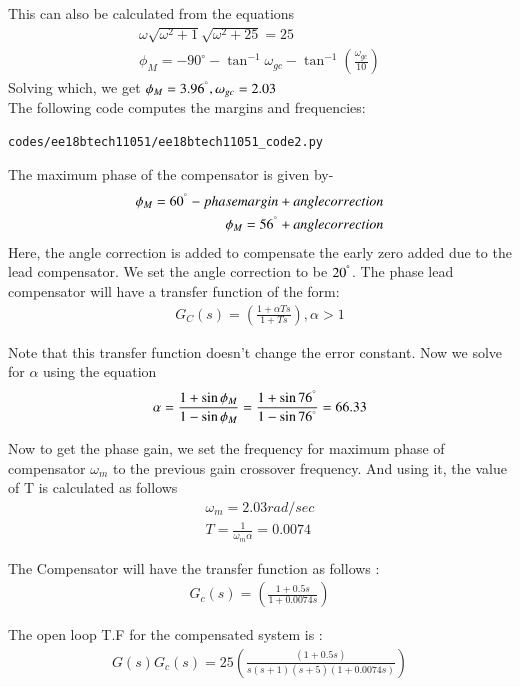 \begin{enumerate}[label=\thesection.\arabic*.,ref=\thesection.\theenumi]
This can also be calculated from the equations
\begin{align}
    \omega \sqrt{\omega^2 + 1} \sqrt{\omega^2 + 25} = 25\\
    \phi_{M} = -90^{\circ} - \tan^{-1}{\omega_{gc}} - \tan^{-1}({\frac{\omega_{gc}}{10}})
\end{align}
Solving which, we get $\phi_{M} =  3.96^{\degree} , \omega_{gc} =  2.03$\\

The following code computes the margins and frequencies:
\begin{lstlisting}
codes/ee18btech11051/ee18btech11051_code2.py
\end{lstlisting}

The maximum phase of the compensator is given by-
\begin{align}
    \phi_{M} = 60^{\degree} - phase margin + angle correction\\
    \phi_{M} = 56^{\degree} + angle correction
\end{align}
Here, the angle correction is added to compensate the early zero added due to the lead compensator. We set the angle correction to be $20^{\degree}$.
The phase lead compensator will have a transfer function of the form:
\begin{align}
    G_{C}(s) = \left(\frac{1+\alpha Ts} {1+Ts}\right), \alpha >1
\end{align}


Note that this transfer function doesn't change the error constant.
Now we solve for $\alpha$ using the equation
\begin{align}
    \alpha = \frac{1+\sin{\phi_{M}}}{1-\sin{\phi_{M}}} = \frac{1+\sin{76^{\degree}}}{1-\sin{76^{\degree}}} = 66.33
\end{align}

Now to get the phase gain, we set the frequency for maximum phase of compensator $\omega_{m}$ to the previous gain crossover frequency. And using it, the value of T is calculated as follows
\begin{align}
    \omega_{m} = 2.03 rad/sec \\
    T = \frac{1}{\omega_{m}\alpha} = 0.0074
\end{align}


The Compensator will have the transfer function as follows :
\begin{align}
G_{c}(s) = \left(\frac{1 + 0.5s}{1 + 0.0074s}\right)
\end{align}

The open loop T.F for the compensated system is  :
\begin{align}
    G(s) G_{c}(s) = 25\left(\frac{(1+0.5s)}{s(s+1)(s+5)(1+0.0074s)}\right)
\end{align}



\end{enumerate}
